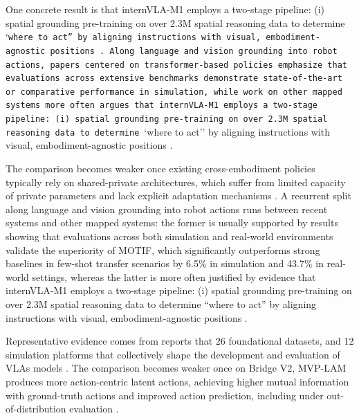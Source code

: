 \documentclass[a4paper,11pt]{article}
\begin{document}
One concrete result is that internVLA-M1 employs a two-stage pipeline: (i) spatial grounding pre-training on over 2.3M spatial reasoning data to determine `\texttt{where to act'' by aligning instructions with visual, embodiment-agnostic positions \citep{Chen2025Internvla}. Along language and vision grounding into robot actions, papers centered on transformer-based policies emphasize that evaluations across extensive benchmarks demonstrate state-of-the-art or comparative performance in simulation, while work on other mapped systems more often argues that internVLA-M1 employs a two-stage pipeline: (i) spatial grounding pre-training on over 2.3M spatial reasoning data to determine }`where to act'' by aligning instructions with visual, embodiment-agnostic positions \citep{Zheng2025Soft,Hou2025Dita,Chen2025Internvla,Sridhar2025Ricl}.

The comparison becomes weaker once existing cross-embodiment policies typically rely on shared-private architectures, which suffer from limited capacity of private parameters and lack explicit adaptation mechanisms \citep{Zhi2026Motif}. A recurrent split along language and vision grounding into robot actions runs between recent systems and other mapped systems: the former is usually supported by results showing that evaluations across both simulation and real-world environments validate the superiority of MOTIF, which significantly outperforms strong baselines in few-shot transfer scenarios by 6.5\% in simulation and 43.7\% in real-world settings, whereas the latter is more often justified by evidence that internVLA-M1 employs a two-stage pipeline: (i) spatial grounding pre-training on over 2.3M spatial reasoning data to determine ``where to act'' by aligning instructions with visual, embodiment-agnostic positions \citep{Zhi2026Motif,Ye2026St4Vla,Chen2025Internvla,Sridhar2025Ricl}.

Representative evidence comes from reports that 26 foundational datasets, and 12 simulation platforms that collectively shape the development and evaluation of VLAs models \citep{Din2025Vision}. The comparison becomes weaker once on Bridge V2, MVP-LAM produces more action-centric latent actions, achieving higher mutual information with ground-truth actions and improved action prediction, including under out-of-distribution evaluation \citep{Lee2026Learning}.
\end{document}
